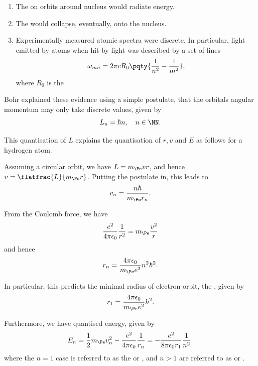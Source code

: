 \begin{enumerate}[label=(\roman*)]
    \item The \Pelectron on orbits around nucleus would radiate energy.
    \item The \Pelectron would collapse, eventually, onto the nucleus.
    \item Experimentally measured atomic spectra were discrete. In particular, light emitted by atoms when hit by light was described by a set of lines
    \begin{equation}
        \omega_{mn} = 2 \pi c R_0 \pqty{\frac{1}{n^2} - \frac{1}{m^2}},
    \end{equation}
    where \(R_0\) is the .
\end{enumerate}

Bohr explained these evidence using a simple postulate, that the orbitals angular momentum may only take discrete values, given by
\begin{equation}
    L_n = \hbar n, \quad n \in \NN.
\end{equation}

This quantisation of \(L\) explains the quantisation of \(r, v\) and \(E\) as follows for a hydrogen atom.

Assuming a circular orbit, we have \(L = m_{\Pe} v r\), and hence \(v = \flatfrac{L}{m_{\Pe} r}\). Putting the postulate in, this leads to
\begin{equation}
    v_n = \frac{n \hbar}{m_{\Pe} r_n}.
\end{equation}

From the Coulomb force, we have
\begin{equation}
    \frac{e^2}{4 \pi \epsilon_0} \frac{1}{r^2} = m_{\Pe} \frac{v^2}{r}
\end{equation}
and hence
\begin{equation}
    r_n = \frac{4 \pi \epsilon_0}{m_{\Pe} e^2} n^2 \hbar^2.
\end{equation}

In particular, this predicts the minimal radius of electron orbit, the , given by
\begin{equation}
    r_1 = \frac{4 \pi \epsilon_0}{m_{\Pe} e^2} \hbar^2.
\end{equation}

Furthermore, we have quantised energy, given by
\begin{equation}
    E_n = \frac{1}{2} m_{\Pe} v_n^2 - \frac{e^2}{4 \pi \epsilon_0} \frac{1}{r_n} = - \frac{e^2}{8 \pi \epsilon_0 r_1} \frac{1}{n^2}.
\end{equation}
where the \(n = 1\) case is referred to as the  or , and \(n > 1\) are referred to as  or .


